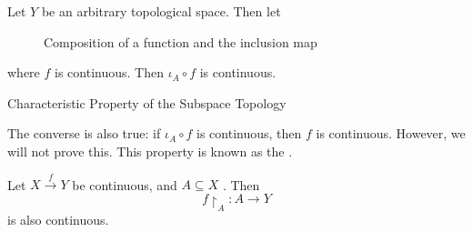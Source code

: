 \documentclass[notoc,notitlepage]{tufte-book}
\begin{document}
Let $Y$ be an arbitrary topological space. Then let

\begin{figure}[ht]
  \centering
  \caption{Composition of a function and the inclusion map}
  \label{fig:composition_of_a_function_and_the_inclusion_map}
\end{figure}

where $f$ is continuous. Then $\iota_A \circ f$ is continuous.

\begin{marginfigure}
  \centering
  \caption{Characteristic Property of the Subspace Topology}
  \label{fig:characteristic_property_of_the_subspace_topology}
\end{marginfigure}

The converse is also true: if $\iota_A \circ f$ is continuous, then $f$ is continuous.
However, we will not prove this. This property is known as the
.

\begin{lemma}\label{lemma:restriction_of_a_continuous_map_is_continuous}
  Let $X \overset{f}{\to} Y$ be continuous, and $A \subseteq X$
  . Then
  \begin{equation*}
    f \restriction_{A} : A \to Y
  \end{equation*}
  is also continuous.
\end{lemma}
\end{document}
